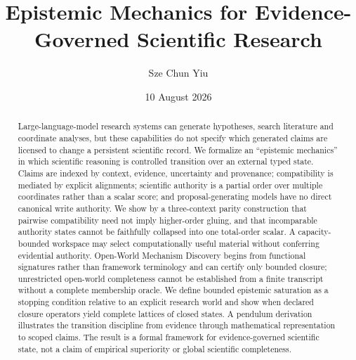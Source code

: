 \documentclass[11pt]{article}
\title{Epistemic Mechanics for Evidence-Governed Scientific Research}
\author{Sze Chun Yiu}
\date{10 August 2026}
\begin{document}
\setlength{\emergencystretch}{3em}
\allowdisplaybreaks
\maketitle

\begin{abstract}
Large-language-model research systems can generate hypotheses, search literature and coordinate analyses, but these capabilities do not specify which generated claims are licensed to change a persistent scientific record. We formalize an ``epistemic mechanics'' in which scientific reasoning is controlled transition over an external typed state. Claims are indexed by context, evidence, uncertainty and provenance; compatibility is mediated by explicit alignments; scientific authority is a partial order over multiple coordinates rather than a scalar score; and proposal-generating models have no direct canonical write authority. We show by a three-context parity construction that pairwise compatibility need not imply higher-order gluing, and that incomparable authority states cannot be faithfully collapsed into one total-order scalar. A capacity-bounded workspace may select computationally useful material without conferring evidential authority. Open-World Mechanism Discovery begins from functional signatures rather than framework terminology and can certify only bounded closure; unrestricted open-world completeness cannot be established from a finite transcript without a complete membership oracle. We define bounded epistemic saturation as a stopping condition relative to an explicit research world and show when declared closure operators yield complete lattices of closed states. A pendulum derivation illustrates the transition discipline from evidence through mathematical representation to scoped claims. The result is a formal framework for evidence-governed scientific state, not a claim of empirical superiority or global scientific completeness.
\end{abstract}


















\end{document}
